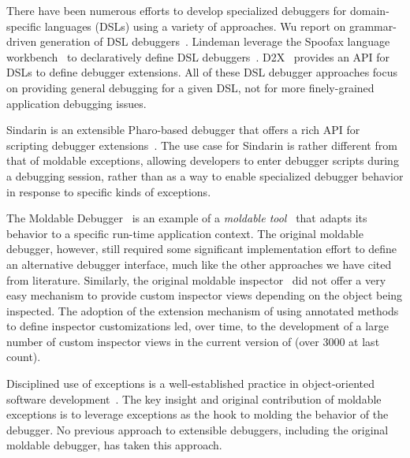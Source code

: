 \documentclass[sigplan,anonymous,review,10pt]{acmart}
\newcommand\on[1]{\nbc{ON}{#1}{olive}} %
\newcommand\ac[1]{\nbc{AC}{#1}{teal}}
\newcommand{\GT}{\lst{GT}\xspace} %
\begin{document}
There have been numerous efforts to develop specialized debuggers for domain-specific languages (DSLs) using a variety of approaches.
Wu \etal report on grammar-driven generation of DSL debuggers~\cite{HuiW08a}.
Lindeman \etal leverage the Spoofax language workbench~\cite{Kats10a} to declaratively define DSL debuggers~\cite{Lind11a}.
D2X~\cite{Brah23a} provides an API for DSLs to define debugger extensions.
All of these DSL debugger approaches focus on providing general debugging for a given DSL, not for more finely-grained application debugging issues.

Sindarin is an extensible Pharo-based debugger that offers a rich API for scripting debugger extensions~\cite{Dupr19a}.
The use case for Sindarin is rather different from that of moldable exceptions, allowing developers to enter debugger scripts during a debugging session, rather than as a way to enable specialized debugger behavior in response to specific kinds of exceptions.

The Moldable Debugger~\cite{Chis15c} is an example of a \emph{moldable tool}~\cite{Chis17a} that adapts its behavior to a specific run-time application context.
The original moldable debugger, however, still required some significant implementation effort to define an alternative debugger interface, much like the other approaches we have cited from literature.
Similarly, the original moldable inspector~\cite{Chis15a} did not offer a very easy mechanism to provide custom inspector views depending on the object being inspected.
The adoption of the extension mechanism of using annotated methods to define inspector customizations led, over time, to the development of a large number of custom inspector views in the current version of \GT (over 3000 at last count).

Disciplined use of exceptions is a well-established practice in object-oriented software development~\cite{Meye88a}.
The key insight and original contribution of moldable exceptions is to leverage exceptions as the hook to molding the behavior of the debugger.
No previous approach to extensible debuggers, including the original moldable debugger, has taken this approach.

\end{document}
